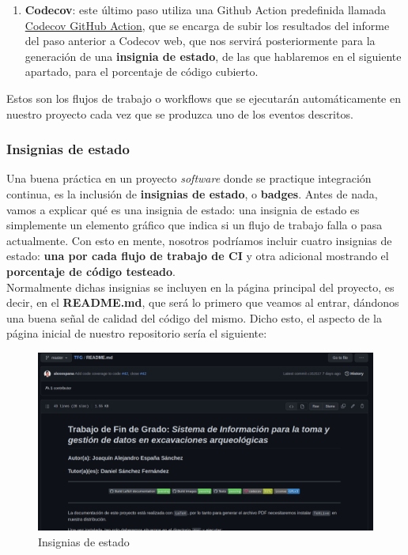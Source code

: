 \begin{enumerate}
\begin{enumerate}
\begin{enumerate}
                        \item \textbf{Codecov}: este último paso utiliza una Github Action
                        predefinida llamada
                        \href{https://github.com/marketplace/actions/codecov}{Codecov GitHub
                        Action}, que se encarga de subir los resultados del informe del paso
                        anterior a Codecov web, que nos servirá posteriormente para la
                        generación de una \textbf{insignia de estado}, de las que hablaremos
                        en el siguiente apartado, para el porcentaje de código cubierto.
                    \end{enumerate}
            \end{enumerate}
    \end{enumerate}

Estos son los flujos de trabajo o workflows que se ejecutarán automáticamente en nuestro
proyecto cada vez que se produzca uno de los eventos descritos.

\subsubsection{Insignias de estado}
Una buena práctica en un proyecto \textit{software} donde se practique integración continua,
es la inclusión de \textbf{insignias de estado}, o \textbf{badges}. Antes de nada, vamos a
explicar qué es una insignia de estado: una insignia de estado es simplemente un elemento
gráfico que indica si un flujo de trabajo falla o pasa actualmente. Con esto en mente,
nosotros podríamos incluir cuatro insignias de estado: \textbf{una por cada flujo de
trabajo de CI} y otra adicional mostrando el \textbf{porcentaje de código testeado}.\\

Normalmente dichas insignias se incluyen en la página principal del proyecto, es decir, en
el \textbf{README.md}, que será lo primero que veamos al entrar, dándonos una buena señal
de calidad del código del mismo. Dicho esto, el aspecto de la página inicial de nuestro
repositorio sería el siguiente:

    \begin{figure}[H]
        \centering
        \includegraphics[scale=0.27]{imagenes/badge-status.png}
        \caption{Insignias de estado}
        \label{fig:badge-status}
    \end{figure}

